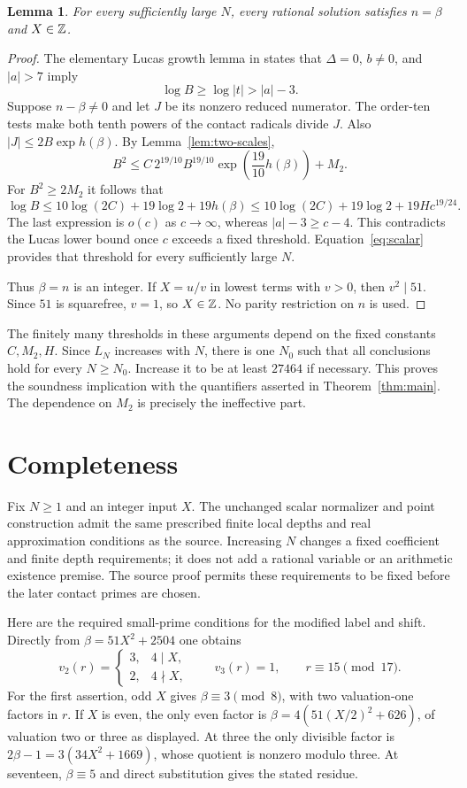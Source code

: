\documentclass[11pt,a4paper]{article}
\newtheorem{lemma}[theorem]{Lemma}
\theoremstyle{remark}\newtheorem{remark}[theorem]{Remark}
\begin{document}
\begin{lemma}\label{lem:input}
For every sufficiently large $N$, every rational solution satisfies
$n=\beta$ and $X\in\mathbb Z$.
\end{lemma}
\begin{proof}
The elementary Lucas growth lemma in \cite[Section 5]{Quartic392}
states that $\Delta=0$, $b\ne0$, and $|a|>7$ imply
\[
                         \log B\ge\log|t|>|a|-3.
\]
Suppose $n-\beta\ne0$ and let $J$ be its nonzero reduced numerator.
The order-ten tests make both tenth powers of the contact radicals
divide $J$. Also $|J|\le2B\exp h(\beta)$. By
Lemma~\ref{lem:two-scales},
\[
 B^2\le C\,2^{19/10}B^{19/10}
                     \exp\!\left(\frac{19}{10}h(\beta)\right)+M_2.
\]
For $B^2\ge2M_2$ it follows that
\[
 \log B\le10\log(2C)+19\log2+19h(\beta)
 \le10\log(2C)+19\log2+19Hc^{19/24}.
\]
The last expression is $o(c)$ as $c\to\infty$, whereas
$|a|-3\ge c-4$. This contradicts the Lucas lower bound once
$c$ exceeds a fixed threshold. Equation~\eqref{eq:scalar}
provides that threshold for every sufficiently large $N$.

Thus $\beta=n$ is an integer. If $X=u/v$ in lowest terms
with $v>0$, then $v^2\mid51$. Since $51$ is squarefree, $v=1$,
so $X\in\mathbb Z$. No parity restriction on $n$ is used.
\end{proof}

The finitely many thresholds in these arguments depend on the
fixed constants $C,M_2,H$. Since $L_N$ increases with $N$, there
is one $N_0$ such that all conclusions hold for every $N\ge N_0$.
Increase it to be at least $27464$ if necessary. This proves the
soundness implication with the quantifiers asserted in
Theorem~\ref{thm:main}. The dependence on $M_2$ is precisely the
ineffective part.

\section{Completeness}
Fix $N\ge1$ and an integer input $X$. The unchanged scalar
normalizer and point construction admit the same prescribed finite
local depths and real approximation conditions as the source.
Increasing $N$ changes a fixed coefficient and finite depth
requirements; it does not add a rational variable or an
arithmetic existence premise. The source proof permits these
requirements to be fixed before the later contact primes are
chosen.

Here are the required small-prime conditions for the modified
label and shift. Directly from $\beta=51X^2+2504$ one obtains
\[
 v_2(r)=\begin{cases}3,&4\mid X,\\2,&4\nmid X,\end{cases}
 \qquad v_3(r)=1,\qquad r\equiv15\pmod{17}.
\]
For the first assertion, odd $X$ gives $\beta\equiv3\pmod8$,
with two valuation-one factors in $r$. If $X$ is even, the only
even factor is $\beta=4(51(X/2)^2+626)$, of valuation two or
three as displayed. At three the only divisible factor is
$2\beta-1=3(34X^2+1669)$, whose quotient is nonzero modulo
three. At seventeen, $\beta\equiv5$ and direct substitution
gives the stated residue.
\end{document}
